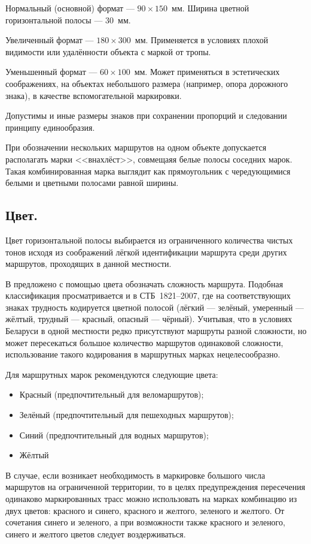 \documentclass[a4paper,12pt]{extarticle}
\begin{document}
Нормальный (основной) формат --- $90\times150$~мм. Ширина цветной горизонтальной полосы --- 30~мм.

Увеличенный формат --- $180\times300$~мм. Применяется в условиях плохой видимости или удалённости объекта с маркой от тропы.

Уменьшенный формат --- $60\times100$~мм. Может применяться в эстетических соображениях, на объектах небольшого размера
(например, опора дорожного знака), в качестве вспомогательной маркировки.

Допустимы и иные размеры знаков при сохранении пропорций и следовании принципу единообразия.

При обозначении нескольких маршрутов на одном объекте допускается располагать марки <<внахлёст>>, совмещаяя белые полосы
соседних марок. Такая комбинированная марка выглядит как прямоугольник с чередующимися белыми и цветными полосами равной
ширины.

\subsection{Цвет.}
Цвет горизонтальной полосы выбирается из ограниченного количества чистых тонов исходя из соображений лёгкой
идентификации маршрута среди других маршрутов, проходящих в данной местности.

В \cite{metodussr} предложено с помощью цвета обозначать сложность маршрута. Подобная классификация просматривается и в
СТБ~1821--2007, где на соответствующих знаках трудность кодируется цветной полосой  (лёгкий --- зелёный, умеренный ---
жёлтый, трудный --- красный, опасный --- чёрный). Учитывая, что в условиях Беларуси в одной местности редко присутствуют
маршруты разной сложности, но может пересекаться большое количество маршрутов одинаковой сложности, использование такого
кодирования в маршрутных марках нецелесообразно.


Для маршрутных марок рекомендуются следующие цвета:
\begin{itemize}
	\item Красный (предпочтительный для веломаршрутов);
	\item Зелёный (предпочтительный для пешеходных маршрутов);
	\item Синий (предпочтительный для водных маршрутов);
	\item Жёлтый
\end{itemize}

В случае, если возникает необходимость в маркировке большого числа маршрутов на ограниченной территории, то в целях
предупреждения пересечения одинаково маркированных трасс можно использовать на марках комбинацию из двух цветов:
красного и синего, красного и желтого, зеленого и желтого. От сочетания синего и зеленого, а при возможности
также красного и зеленого, синего и желтого цветов следует воздерживаться.
\end{document}

